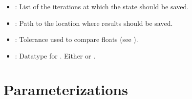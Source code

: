 \documentclass[letterpaper,10pt,english]{sphinxmanual}
\begin{document}
\begin{description}
\begin{itemize}
\begin{itemize}
\end{itemize}

\item {} 
: List of the iterations at which the state should be saved.

\item {} 
: Path to the location where results should be saved.

\item {} 
: Tolerance used to compare floats (see ).

\item {} 
: Datatype for . Either  or .

\end{itemize}

\end{description}


\section{Parameterizations}
\label{\detokenize{api:parameterizations}}
\end{document}

